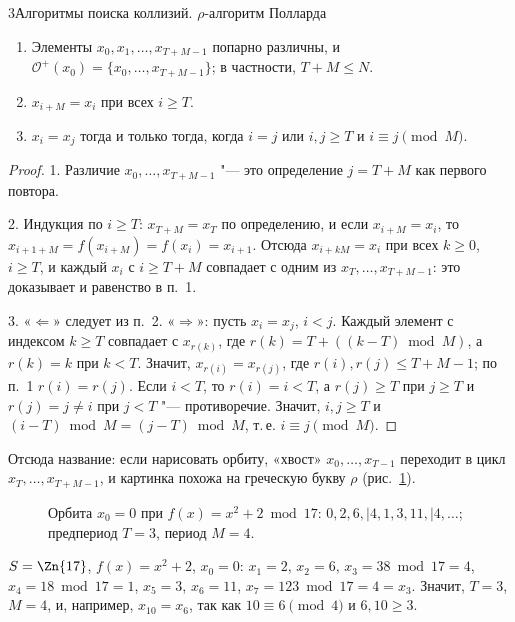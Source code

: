 \begin{lecture}{3}{Алгоритмы поиска коллизий. \texorpdfstring{$\rho$}{ρ}-алгоритм Полларда}
\begin{theorem}\label{l3:orbit}
\begin{enumerate}
  \item Элементы $x_0, x_1, \dots, x_{T+M-1}$ попарно различны, и
    $\mathcal{O}^+(x_0) = \{x_0, \dots, x_{T+M-1}\}$; в частности, $T + M \le N$.
  \item $x_{i+M} = x_i$ при всех $i \ge T$.
  \item $x_i = x_j$ тогда и только тогда, когда $i = j$ или $i, j \ge T$ и
    $i \equiv j \pmod M$.
\end{enumerate}
\end{theorem}

\begin{proof}
1. Различие $x_0, \dots, x_{T+M-1}$ "--- это определение $j = T + M$ как первого повтора.

2. Индукция по $i \ge T$: $x_{T+M} = x_T$ по определению, и если $x_{i+M} = x_i$, то
$x_{i+1+M} = f(x_{i+M}) = f(x_i) = x_{i+1}$. Отсюда $x_{i + kM} = x_i$ при всех $k \ge 0$,
$i \ge T$, и каждый $x_i$ с $i \ge T + M$ совпадает с одним из $x_T, \dots, x_{T+M-1}$:
это доказывает и равенство в п.~1.

3. «$\Leftarrow$» следует из п.~2. «$\Rightarrow$»: пусть $x_i = x_j$, $i < j$. Каждый элемент
с индексом $k \ge T$ совпадает с $x_{r(k)}$, где $r(k) = T + ((k - T) \bmod M)$, а
$r(k) = k$ при $k < T$. Значит, $x_{r(i)} = x_{r(j)}$, где $r(i), r(j) \le T + M - 1$; по п.~1
$r(i) = r(j)$. Если $i < T$, то $r(i) = i < T$, а $r(j) \ge T$ при $j \ge T$ и $r(j) = j \ne i$
при $j < T$ "--- противоречие. Значит, $i, j \ge T$ и $(i - T) \bmod M = (j - T) \bmod M$,
т.\,е. $i \equiv j \pmod M$.
\end{proof}

Отсюда название: если нарисовать орбиту, «хвост» $x_0, \dots, x_{T-1}$ переходит в цикл
$x_T, \dots, x_{T+M-1}$, и картинка похожа на греческую букву $\rho$
(рис.~\ref{l3:fig-rho}).

\begin{figure}[ht]
\centering
{}
\caption{Орбита $x_0 = 0$ при $f(x) = x^2 + 2 \bmod 17$: $0, 2, 6, \mid 4, 1, 3, 11, \mid 4, \dots$;
предпериод $T = 3$, период $M = 4$.}\label{l3:fig-rho}
\end{figure}

\begin{example}
$S = \Zn{17}$, $f(x) = x^2 + 2$, $x_0 = 0$: $x_1 = 2$, $x_2 = 6$, $x_3 = 38 \bmod 17 = 4$,
$x_4 = 18 \bmod 17 = 1$, $x_5 = 3$, $x_6 = 11$, $x_7 = 123 \bmod 17 = 4 = x_3$. Значит,
$T = 3$, $M = 4$, и, например, $x_{10} = x_6$, так как $10 \equiv 6 \pmod 4$ и $6, 10 \ge 3$.
\end{example}


\end{lecture}
